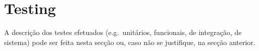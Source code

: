 \section{Testing} %
\label{sec:testing}

A descrição dos testes efetuados (e.g.\ unitários, funcionais, de integração, de sistema) pode ser feita nesta secção ou, caso não se justifique, na secção anterior.

